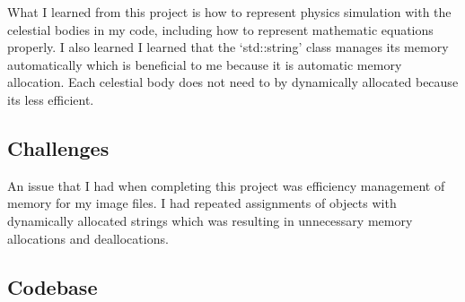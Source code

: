 What I learned from this project is how to represent physics simulation with the celestial bodies in my code, including how to represent mathematic equations properly. I also learned I learned that the ‘std::string’ class manages its memory automatically which is beneficial to me because it is automatic memory allocation. Each celestial body does not need to by dynamically allocated because its less efficient.

\subsection{Challenges}\label{sec:ps3:challenges}

An issue that I had when completing this project was efficiency management of memory for my image files. I had repeated assignments of objects with dynamically allocated strings which was resulting in unnecessary memory allocations and deallocations.

\subsection{Codebase}\label{sec:ps3:code}










\newpage
